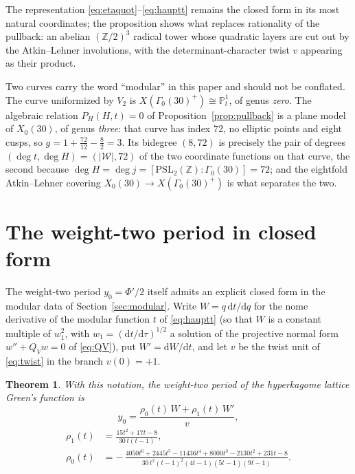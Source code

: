 \documentclass[11pt]{article}
\newcommand{\rmd}{\mathrm{d}}
\theoremstyle{plain}
\newtheorem{thm}{Theorem}[section]
\theoremstyle{remark}
\begin{document}
The representation \eqref{eq:etaquot}--\eqref{eq:hauptt} remains the closed form in its most natural
coordinates; the proposition shows what replaces rationality of the pullback: an abelian $(\mathbb{Z}/2)^3$
radical tower whose quadratic layers are cut out by the Atkin--Lehner involutions, with the
determinant-character twist $v$ appearing as their product.

Two curves carry the word ``modular'' in this paper and should not be conflated. The curve
uniformized by $V_2$ is $X(\Gamma_0(30)^+)\cong\mathbb{P}^1_t$, of genus \emph{zero}. The algebraic
relation $P_H(H,t)=0$ of Proposition~\ref{prop:pullback} is a plane model of $X_0(30)$, of genus
\emph{three}: that curve has index $72$, no elliptic points and eight cusps, so
$g=1+\tfrac{72}{12}-\tfrac82=3$. Its bidegree $(8,72)$ is precisely the pair of degrees
$(\deg t,\deg H)=(|\mathcal{W}|,72)$ of the two coordinate functions on that curve, the second
because $\deg H=\deg j=[\mathrm{PSL}_2(\mathbb{Z}):\Gamma_0(30)]=72$; and the eightfold
Atkin--Lehner covering $X_0(30)\to X(\Gamma_0(30)^+)$ is what separates the two.

\section{The weight-two period in closed form}
\label{sec:y0closed}

The weight-two period $y_0=\Phi'/2$ itself admits an explicit closed form in the modular data of
Section~\ref{sec:modular}. Write $W=q\,\rmd t/\rmd q$ for the nome derivative of the modular function $t$ of
\eqref{eq:hauptt} (so that $W$ is a constant multiple of $w_1^2$, with $w_1=(\rmd t/\rmd\tau)^{1/2}$ a
solution of the projective normal form $w''+Q_Vw=0$ of \eqref{eq:QV}), put $W'=\rmd W/\rmd t$, and let
$v$ be the twist unit of \eqref{eq:twist} in the branch $v(0)=+1$.

\begin{thm}\label{thm:y0}
With this notation, the weight-two period of the hyperkagome lattice Green's function is
\begin{equation}
y_0=\frac{\rho_0(t)\,W+\rho_1(t)\,W'}{v},
\label{eq:y0closed}
\end{equation}
\begin{equation}
\begin{split}
\rho_1(t)&=\frac{15t^2+17t-8}{30\,t(t-1)},\\[4pt]
\rho_0(t)&=-\,\frac{4050t^6+2445t^5-11436t^4+8000t^3-2130t^2+231t-8}
{30\,t^2(t-1)^2(4t-1)(5t-1)(9t-1)}.
\end{split}
\label{eq:y0rhos}
\end{equation}
\end{thm}
\end{document}
